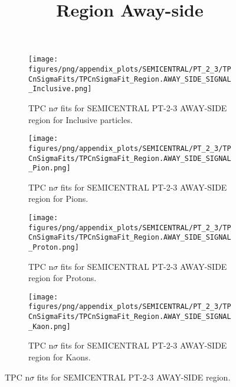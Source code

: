             \begin{figure}[H]
                \title{Region Away-side}
                \begin{subfigure}[b]{0.5\textwidth}
                    \centering
                    \texttt{[image: figures/png/appendix\_plots/SEMICENTRAL/PT\_2\_3/TPCnSigmaFits/TPCnSigmaFit\_Region.AWAY\_SIDE\_SIGNAL\_Inclusive.png]}
                    \caption{TPC n$\sigma$ fits for SEMICENTRAL PT-2-3 AWAY-SIDE region for Inclusive particles.}
                    \label{fig:appendix_SEMICENTRAL_PT-2-3_AWAY_SIDE_SIGNAL_Inclusive}
                \end{subfigure}
                \begin{subfigure}[b]{0.5\textwidth}
                    \centering
                    \texttt{[image: figures/png/appendix\_plots/SEMICENTRAL/PT\_2\_3/TPCnSigmaFits/TPCnSigmaFit\_Region.AWAY\_SIDE\_SIGNAL\_Pion.png]}
                    \caption{TPC n$\sigma$ fits for SEMICENTRAL PT-2-3 AWAY-SIDE region for Pions.}
                    \label{fig:appendix_SEMICENTRAL_PT-2-3_AWAY_SIDE_SIGNAL_Pion}
                \end{subfigure}
                \begin{subfigure}[b]{0.5\textwidth}
                    \centering
                    \texttt{[image: figures/png/appendix\_plots/SEMICENTRAL/PT\_2\_3/TPCnSigmaFits/TPCnSigmaFit\_Region.AWAY\_SIDE\_SIGNAL\_Proton.png]}
                    \caption{TPC n$\sigma$ fits for SEMICENTRAL PT-2-3 AWAY-SIDE region for Protons.}
                    \label{fig:appendix_SEMICENTRAL_PT-2-3_AWAY_SIDE_SIGNAL_Proton}
                \end{subfigure}
                \begin{subfigure}[b]{0.5\textwidth}
                    \centering
                    \texttt{[image: figures/png/appendix\_plots/SEMICENTRAL/PT\_2\_3/TPCnSigmaFits/TPCnSigmaFit\_Region.AWAY\_SIDE\_SIGNAL\_Kaon.png]}
                    \caption{TPC n$\sigma$ fits for SEMICENTRAL PT-2-3 AWAY-SIDE region for Kaons.}
                    \label{fig:appendix_SEMICENTRAL_PT-2-3_AWAY_SIDE_SIGNAL_Kaon}
                \end{subfigure}
                \caption{TPC n$\sigma$ fits for SEMICENTRAL PT-2-3 AWAY-SIDE region.}
                \label{fig:appendix_SEMICENTRAL_PT-2-3_AWAY_SIDE_SIGNAL}
            \end{figure}
